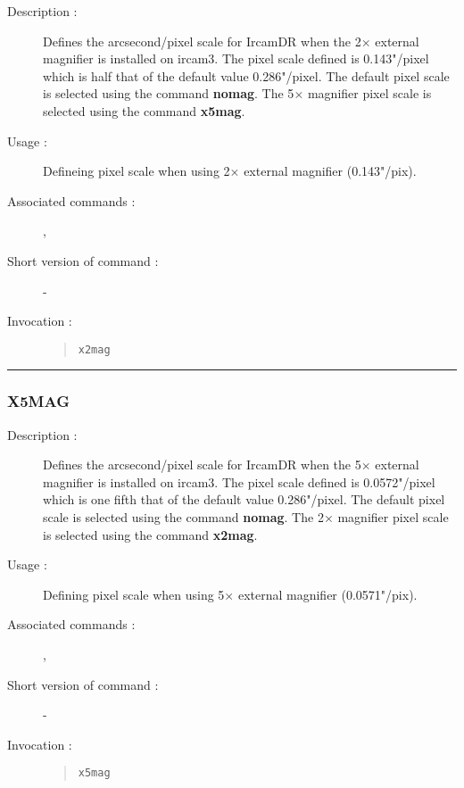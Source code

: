 \begin{description}

\item[Description :] Defines the arcsecond/pixel scale for {\sc
IrcamDR} when the 2$\times$ external magnifier is installed on {\sc
ircam3}.  The pixel scale defined is 0.143"/pixel which is half that of
the default value 0.286"/pixel.  The default pixel scale is selected
using the command {\bf nomag}.  The 5$\times$ magnifier pixel scale is
selected using the command {\bf x5mag}.

\item[Usage :] Defineing pixel scale when using 2$\times$ external magnifier
(0.143"/pix).
\item[Associated commands :] {\tt {}},
{\tt {}}
\item[Short version of command :] -
\item[Invocation :]

\begin{quote}{\tt  x2mag }\end{quote}

\end{description}

\hrule
\subsubsection*{\label{X5MAG}X5MAG}

\begin{description}

\item[Description :] Defines the arcsecond/pixel scale for {\sc
IrcamDR} when the 5$\times$ external magnifier is installed on {\sc
ircam3}.  The pixel scale defined is 0.0572"/pixel which is one fifth
that of the default value 0.286"/pixel.  The default pixel scale is
selected using the command {\bf nomag}.  The 2$\times$ magnifier pixel
scale is selected using the command {\bf x2mag}.

\item[Usage :] Defining pixel scale when using 5$\times$ external magnifier
(0.0571"/pix).
\item[Associated commands :] {\tt {}},
{\tt {}}
\item[Short version of command :] -
\item[Invocation :]

\begin{quote}{\tt  x5mag }\end{quote}

\end{description}

